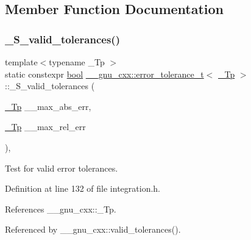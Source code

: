 \subsection{Member Function Documentation}
\mbox{\label{struct____gnu__cxx_1_1error__tolerance__t_af17fb63ac7623ad0090241cff57b7492}} 
\subsubsection{\texorpdfstring{\+\_\+\+S\+\_\+valid\+\_\+tolerances()}{\_S\_valid\_tolerances()}}
{\footnotesize\ttfamily template$<$typename \+\_\+\+Tp $>$ \\
static constexpr \hyperlink{namespace____gnu__cxx_ae83aca57f97767d5d09188718728a0ac}{bool} \hyperlink{struct____gnu__cxx_1_1error__tolerance__t}{\+\_\+\+\_\+gnu\+\_\+cxx\+::error\+\_\+tolerance\+\_\+t}$<$ \hyperlink{namespace____gnu__cxx_a3b19a9c800ca194374ef9172290f7d79}{\+\_\+\+Tp} $>$\+::\+\_\+\+S\+\_\+valid\+\_\+tolerances (\begin{DoxyParamCaption}\item[{\hyperlink{namespace____gnu__cxx_a3b19a9c800ca194374ef9172290f7d79}{\+\_\+\+Tp}}]{\+\_\+\+\_\+max\+\_\+abs\+\_\+err,  }\item[{\hyperlink{namespace____gnu__cxx_a3b19a9c800ca194374ef9172290f7d79}{\+\_\+\+Tp}}]{\+\_\+\+\_\+max\+\_\+rel\+\_\+err }\end{DoxyParamCaption})\hspace{0.3cm}{\ttfamily [inline]}, {\ttfamily [static]}}



Test for valid error tolerances. 



Definition at line 132 of file integration.\+h.



References \+\_\+\+\_\+gnu\+\_\+cxx\+::\+\_\+\+Tp.



Referenced by \+\_\+\+\_\+gnu\+\_\+cxx\+::valid\+\_\+tolerances().



